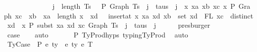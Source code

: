 \begin{isabellebody}
\ \ \ \ \ \ \ \ \ \ \ \ \ \ {\isacartoucheopen}j\ {\isacharless}{\kern0pt}\ length\ Ts\ {\isasymLongrightarrow}\ {\isasymGamma}\ {\isasymturnstile}{\isacharbraceleft}{\kern0pt}P{\isacharbraceright}{\kern0pt}\ Graph\ {\isacharparenleft}{\kern0pt}Ts\ {\isacharbang}{\kern0pt}\ j{\isacharparenright}{\kern0pt}\ {\isacharcolon}{\kern0pt}\ taus\ {\isacharbang}{\kern0pt}\ j\ {\isasymand}\ {\isacharparenleft}{\kern0pt}{\isasymforall}x\ xa\ xb\ xc{\isachardot}{\kern0pt}\ x\ {\isasymturnstile}{\isacharbraceleft}{\kern0pt}P{\isacharbraceright}{\kern0pt}\ Graph\ xc\ {\isacharcolon}{\kern0pt}\ xb\ {\isasymlongrightarrow}\ xa\ {\isasymle}\ length\ x\ {\isasymlongrightarrow}\ {\isacharparenleft}{\kern0pt}{\isasymforall}xd{\isachardot}{\kern0pt}\ {\isasymGamma}\ {\isacharequal}{\kern0pt}\ insert{\isacharunderscore}{\kern0pt}at\ x\ xa\ {\isacharparenleft}{\kern0pt}xd{\isacharcomma}{\kern0pt}\ xb{\isacharparenright}{\kern0pt}\ {\isasymlongrightarrow}\ set\ xd\ {\isacharequal}{\kern0pt}\ FL\ xc\ {\isasymlongrightarrow}\ distinct\ xd\ {\isasymlongrightarrow}\ x\ {\isasymturnstile}{\isacharbraceleft}{\kern0pt}P{\isacharbraceright}{\kern0pt}\ subst\ xa\ xd\ xc\ {\isacharparenleft}{\kern0pt}Graph\ {\isacharparenleft}{\kern0pt}Ts\ {\isacharbang}{\kern0pt}\ j{\isacharparenright}{\kern0pt}{\isacharparenright}{\kern0pt}\ {\isacharcolon}{\kern0pt}\ taus\ {\isacharbang}{\kern0pt}\ j{\isacharparenright}{\kern0pt}{\isacharparenright}{\kern0pt}{\isacartoucheclose}\isanewline
\ \ \ \ \isamarkupfalse%
\ presburger\isanewline
\ \ \ \ \isamarkupfalse%
\isanewline
\isanewline
\ \ \isamarkupfalse%
\ \isamarkupfalse%
\ {\isacharquery}{\kern0pt}case\isanewline
\ \ \isamarkupfalse%
\ auto\isanewline
\ \ \ \ \ \isamarkupfalse%
\ P{}\ TyProd{\isachardot}{\kern0pt}hyps{\isacharparenleft}{\kern0pt}{}{\isacharcomma}{\kern0pt}{}{\isacharcomma}{\kern0pt}{}{\isacharcomma}{\kern0pt}{}{\isacharparenright}{\kern0pt}\ typing{\isachardot}{\kern0pt}TyProd\ \isamarkupfalse%
\ auto\isanewline
{}\isamarkupfalse%
\isanewline
\ \ \isamarkupfalse%
\ {\isacharparenleft}{\kern0pt}TyCase\ {\isasymGamma}\ P\ e{}\ ty{}{\isacharprime}{\kern0pt}\ {\isasymGamma}{}{\isacharprime}{\kern0pt}\ e{}\ ty{}{\isacharprime}{\kern0pt}\ e{}\ T{\isacharparenright}{\kern0pt}\isanewline
\isanewline
\ \ \isamarkupfalse%

\end{isabellebody}
